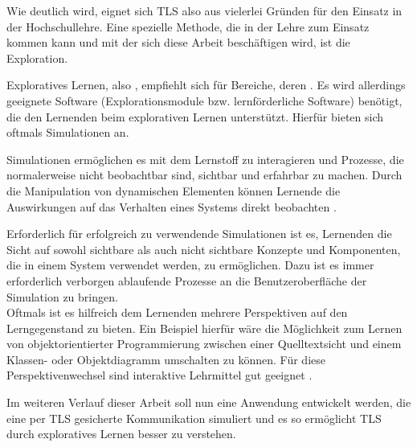 Wie deutlich wird, eignet sich TLS also aus vielerlei Gründen für den Einsatz in der Hochschullehre. Eine spezielle Methode, die in der Lehre zum Einsatz kommen kann und mit der sich diese Arbeit beschäftigen wird, ist die Exploration.

Exploratives Lernen, also , empfiehlt sich für Bereiche, deren  \cite{schubert11}. 
Es wird allerdings geeignete Software (Explorationsmodule bzw. lernförderliche Software) benötigt, die den Lernenden beim explorativen Lernen unterstützt. Hierfür bieten sich oftmals Simulationen an. 

\begin{quote}
 \cite{niegemann08}
\end{quote}

Simulationen ermöglichen es mit dem Lernstoff zu interagieren und Prozesse, die normalerweise nicht beobachtbar sind, sichtbar und erfahrbar zu machen. Durch die Manipulation von dynamischen Elementen können Lernende die Auswirkungen auf das Verhalten eines Systems direkt beobachten \cite{niegemann08}.

Erforderlich für erfolgreich zu verwendende Simulationen ist es, Lernenden die Sicht auf sowohl sichtbare als auch nicht sichtbare Konzepte und Komponenten, die in einem System verwendet werden, zu ermöglichen. Dazu ist es immer erforderlich verborgen ablaufende Prozesse an die Benutzeroberfläche der Simulation zu bringen. \\
Oftmals ist es hilfreich dem Lernenden mehrere Perspektiven auf den Lerngegenstand zu bieten. Ein Beispiel hierfür wäre die Möglichkeit zum Lernen von objektorientierter Programmierung zwischen einer Quelltextsicht und einem Klassen- oder Objektdiagramm umschalten zu können. Für diese Perspektivenwechsel sind interaktive Lehrmittel gut geeignet \cite{schubert11}.

Im weiteren Verlauf dieser Arbeit soll nun eine Anwendung entwickelt werden, die eine per TLS gesicherte Kommunikation simuliert und es so ermöglicht TLS durch exploratives Lernen besser zu verstehen.
